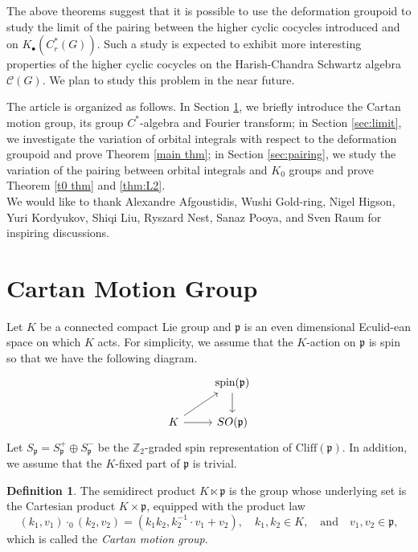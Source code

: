 \documentclass{amsproc}
\theoremstyle{definition}
\newtheorem{definition}[theorem]{Definition}
\theoremstyle{remark}
\numberwithin{equation}{section}
\newcommand{\kp}{\mathfrak{p}}
\begin{document}
The above theorems suggest that it is possible to use the deformation groupoid to study the limit of the pairing between the higher cyclic cocycles introduced \cite{PPT} and \cite{ST1}  on $K_\bullet(C^*_r(G))$. Such a study is expected to exhibit more interesting properties of the higher cyclic cocycles on the Harish-Chandra Schwartz algebra $\mathcal{C}(G)$. We plan to study this problem in the near future. 

The article is organized as follows. In Section \ref{sec:semiproduct}, we briefly introduce the Cartan motion group, its group $C^*$-algebra and Fourier transform; in Section \ref{sec:limit}, we investigate the variation of orbital integrals with respect to the deformation groupoid and prove Theorem \ref{main thm}; in Section \ref{sec:pairing}, we study the variation of the pairing between orbital integrals and $K_0$ groups and prove Theorem \ref{t0 thm} and \ref{thm:L2}.\\

 We would like to thank Alexandre Afgoustidis, Wushi Gold-ring, Nigel Higson, Yuri Kordyukov, Shiqi Liu, Ryszard Nest, Sanaz Pooya,  and Sven Raum for inspiring discussions.

\section{Cartan Motion Group}\label{sec:semiproduct}
Let $K$ be a connected compact Lie group and $\kp$ is an even dimensional Eculid-ean space on which $K$ acts. For simplicity, we assume that the $K$-action on $\kp$ is spin so that we have the following diagram.
\[
 \begin{tikzcd}
   & \text{spin}(\kp) \arrow[d] \\
 K \arrow[ru]\arrow[r] & SO(\kp)
   \end{tikzcd}
    \]
Let $S_\kp = S_\kp^+ \oplus S_\kp^-$ be the $\mathbb{Z}_2$-graded spin representation of $\mathrm{Cliff}(\kp)$. In addition, we assume that the $K$-fixed part of $\kp$ is trivial.  

\begin{definition}
The semidirect product $K \ltimes \kp$ is the group whose underlying set is the Cartesian product $K \times \kp$, equipped with the product law	
\[
(k_1, v_1) \cdot_0 (k_2, v_2) = \left(k_1k_2, k_2^{-1}\cdot v_1 +  v_2\right), \quad k_1, k_2 \in K, \quad  \text{and} \quad v_1, v_2 \in \kp,
\]
which is called the \emph{Cartan motion group}. 
\end{definition}
\end{document}
